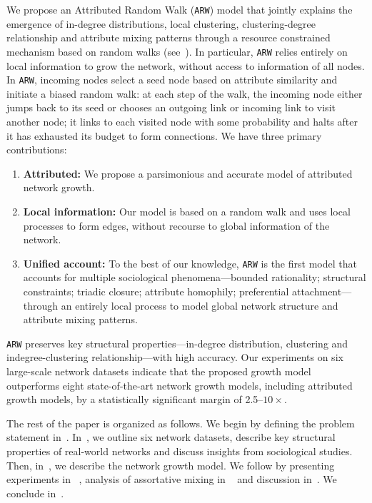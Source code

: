 We propose an Attributed Random Walk (\texttt{ARW}) model that jointly explains
the emergence of in-degree distributions, local clustering, clustering-degree
relationship and attribute mixing patterns through a resource constrained
mechanism based on random walks (see~). In particular,
\texttt{ARW} relies entirely on local information to grow the network, without
access to information of all nodes. In \texttt{ARW}, incoming nodes select a
seed node based on attribute similarity and initiate a biased random walk: at
each step of the walk, the incoming node either jumps back to its seed or
chooses an outgoing link or incoming link to visit another node; it links to
each visited node with some probability and halts after it has exhausted its
budget to form connections. We have three primary contributions:
\begin{enumerate}
\item \textbf{Attributed:} We propose a parsimonious and accurate model of attributed network growth.
\item \textbf{Local information:} Our model is based on a random walk and uses local processes to form edges, without recourse to global information of the network.
\item \textbf{Unified account:} To the best of our knowledge, \texttt{ARW} is the first model that accounts for multiple sociological phenomena---bounded rationality; structural constraints; triadic closure; attribute homophily; preferential attachment---through an entirely local process to model global network structure and attribute mixing patterns.
\end{enumerate}



\texttt{ARW} preserves key structural properties---in-degree distribution, clustering and
indegree-clustering relationship---with high accuracy.
Our experiments on six large-scale network datasets indicate that the proposed growth model outperforms
eight state-of-the-art network growth models, including attributed growth models, by a
statistically significant margin of 2.5--$10\times$.

The rest of the paper is organized as follows.
We begin by defining the problem statement in~.
In~, we outline six network datasets, describe key structural
properties of real-world networks and discuss insights from sociological studies.
Then, in~, we describe the network growth model. We follow
by presenting experiments in ~, analysis of assortative mixing
in ~ and discussion in~.
We conclude in~.